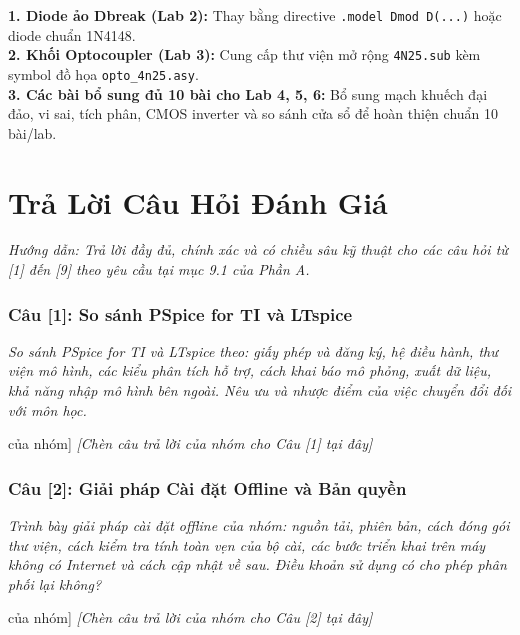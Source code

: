 \documentclass[12pt,a4paper]{report}
\begin{document}
\begin{orangebox}
\textbf{1. Diode ảo Dbreak (Lab 2):} Thay bằng directive \lstinline|.model Dmod D(...)| hoặc diode chuẩn 1N4148.\\
\textbf{2. Khối Optocoupler (Lab 3):} Cung cấp thư viện mở rộng \texttt{4N25.sub} kèm symbol đồ họa \texttt{opto\_4n25.asy}.\\
\textbf{3. Các bài bổ sung đủ 10 bài cho Lab 4, 5, 6:} Bổ sung mạch khuếch đại đảo, vi sai, tích phân, CMOS inverter và so sánh cửa sổ để hoàn thiện chuẩn 10 bài/lab.
\end{orangebox}

\chapter{Trả Lời Câu Hỏi Đánh Giá}

\textit{\color{guidegray}
Hướng dẫn: Trả lời đầy đủ, chính xác và có chiều sâu kỹ thuật cho các câu hỏi từ [1] đến [9] theo yêu cầu tại mục 9.1 của Phần A.
}

\subsection*{Câu [1]: So sánh PSpice for TI và LTspice}
\textit{\color{guidegray}So sánh PSpice for TI và LTspice theo: giấy phép và đăng ký, hệ điều hành, thư viện mô hình, các kiểu phân tích hỗ trợ, cách khai báo mô phỏng, xuất dữ liệu, khả năng nhập mô hình bên ngoài. Nêu ưu và nhược điểm của việc chuyển đổi đối với môn học.}
\begin{orangebox}[Trả lời Câu [1] của nhóm]
\textit{\color{guidegray}[Chèn câu trả lời của nhóm cho Câu [1] tại đây]}
\end{orangebox}

\subsection*{Câu [2]: Giải pháp Cài đặt Offline và Bản quyền}
\textit{\color{guidegray}Trình bày giải pháp cài đặt offline của nhóm: nguồn tải, phiên bản, cách đóng gói thư viện, cách kiểm tra tính toàn vẹn của bộ cài, các bước triển khai trên máy không có Internet và cách cập nhật về sau. Điều khoản sử dụng có cho phép phân phối lại không?}
\begin{orangebox}[Trả lời Câu [2] của nhóm]
\textit{\color{guidegray}[Chèn câu trả lời của nhóm cho Câu [2] tại đây]}
\end{orangebox}
\end{document}
